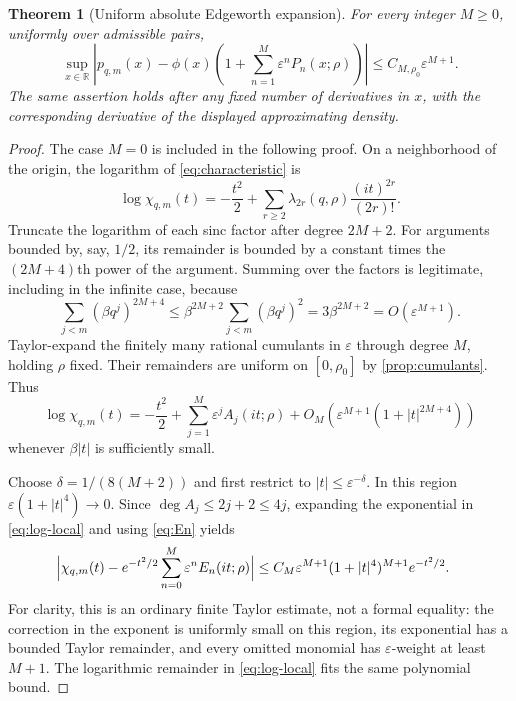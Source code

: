 \documentclass[11pt,a4paper]{article}
\numberwithin{equation}{section}
\newtheorem{theorem}{Theorem}[section]
\theoremstyle{definition}
\theoremstyle{remark}
\newcommand{\R}{\mathbb R}
\newcommand{\eps}{\varepsilon}
\begin{document}
\begin{theorem}[Uniform absolute Edgeworth expansion]
\label{thm:density-expansion}
For every integer $M\ge0$, uniformly over admissible pairs,
\begin{equation}
 \sup_{x\in\R}\left|
 p_{q,m}(x)-\phi(x)\left(1+\sum_{n=1}^{M}\eps^nP_n(x;\rho)\right)
 \right|\le C_{M,\rho_0}\eps^{M+1}.
 \label{eq:density-expansion}
\end{equation}
The same assertion holds after any fixed number of derivatives in $x$, with
the corresponding derivative of the displayed approximating density.
\end{theorem}
\begin{proof}
The case $M=0$ is included in the following proof. On a neighborhood of the
origin, the logarithm of \eqref{eq:characteristic} is
\[
 \log\chi_{q,m}(t)
 =-\frac{t^2}{2}+\sum_{r\ge2}
  \lambda_{2r}(q,\rho)\frac{(it)^{2r}}{(2r)!}.
\]
Truncate the logarithm of each sinc factor after degree $2M+2$.
For arguments bounded by, say, $1/2$, its remainder is bounded by a constant
times the $(2M+4)$th power of the argument. Summing over the factors is
legitimate, including in the infinite case, because
\begin{equation}
 \sum_{j<m}(\beta q^j)^{2M+4}
 \le\beta^{2M+2}\sum_{j<m}(\beta q^j)^2
 =3\beta^{2M+2}=O(\eps^{M+1}).
 \label{eq:log-remainder}
\end{equation}
Taylor-expand the finitely many rational cumulants in $\eps$ through degree
$M$, holding $\rho$ fixed. Their remainders are uniform on
$[0,\rho_0]$ by \cref{prop:cumulants}. Thus
\begin{equation}
 \log\chi_{q,m}(t)
 =-\frac{t^2}{2}+\sum_{j=1}^{M}\eps^jA_j(it;\rho)
 +O_M\!\left(\eps^{M+1}(1+|t|^{2M+4})\right)
 \label{eq:log-local}
\end{equation}
whenever $\beta|t|$ is sufficiently small.

Choose $\delta=1/(8(M+2))$ and first restrict to
$|t|\le\eps^{-\delta}$. In this region
$\eps(1+|t|^4)\to0$. Since $\deg A_j\le2j+2\le4j$, expanding the
exponential in \eqref{eq:log-local} and using \eqref{eq:En} yields
\begin{align}
 \Bigl|\chi_{q,m}(t)
 -e^{-t^2/2}\sum_{n=0}^{M}\eps^nE_n(it;\rho)\Bigr|
 &\le C_M\eps^{M+1}(1+|t|^4)^{M+1}e^{-t^2/2}.
 \label{eq:local-fourier-error}
\end{align}
For clarity, this is an ordinary finite Taylor estimate, not a formal equality:
the correction in the exponent is uniformly small on this region, its
exponential has a bounded Taylor remainder, and every omitted monomial has
$\eps$-weight at least $M+1$. The logarithmic remainder in
\eqref{eq:log-local} fits the same polynomial bound.


\end{proof}
\end{document}
